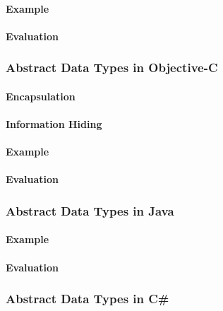 \paragraph{Example}\label{par:C++_Abstract_Data_Type_Example}
\paragraph{Evaluation}\label{par:C++_Abstract_Data_Type_Evaluation}

\subsubsection{Abstract Data Types in Objective-C}\label{subsubsec:Abstract_Data_Types_Objective_C}
\paragraph{Encapsulation}\label{par:Objective_C_Encapsulation}
\paragraph{Information Hiding}\label{par:Objective_C_Info_Hiding}
\paragraph{Example}\label{par:Objective_C_Abstract_Data_Type_Example}
\paragraph{Evaluation}\label{par:Objective_C_Abstract_Data_Type_Evaluation}

\subsubsection{Abstract Data Types in Java}\label{subsubsec:Abstract_Data_Types_Java}
\paragraph{Example}\label{par:Java_Abstract_Data_Type_Example}
\paragraph{Evaluation}\label{par:Java_Abstract_Data_Type_Evaluation}

\subsubsection{Abstract Data Types in C\#}\label{subsubsec:Abstract_Data_Types_CSharp}
